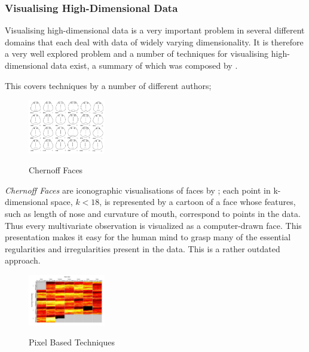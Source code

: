 \documentclass[a4paper,11pt,titlepage]{article}
\begin{document}
	\subsubsection{Visualising High-Dimensional Data}
	Visualising high-dimensional data is a very important problem in several different domains that each deal with data of widely varying dimensionality. It is therefore a very well explored problem and a number of techniques for visualising high-dimensional data exist, a summary of which was composed by \cite{Cristina2003}.
	\par 
	This covers techniques by a number of different authors;	
		\par
		
 	\begin{figure}[H]
    			\centering	
			{{\includegraphics[width=0.3\textwidth]
    				{img/chernoff_faces} 
    			}}%
    			\caption{Chernoff Faces}%
    		\label{fig:lascaux}
	\end{figure}
 		
		 \textit{Chernoff Faces} are iconographic visualisations of faces by \cite{Chernoff1973}; each point in k-dimensional space, $ k < 18 $, is represented by a cartoon of a face whose features, such as length of nose and curvature of mouth, correspond to points in the data. Thus every multivariate observation is visualized as a computer-drawn face. This presentation makes it easy for the human mind to grasp many of the essential regularities and irregularities present in the data. This is a rather outdated approach.
		 \par
 		
 	\begin{figure}[H]
    			\centering	
			{{\includegraphics[width=0.3\textwidth]
    				{img/kiem_pixel_two} 
    			}}%
    			\caption{Pixel Based Techniques}%
    		\label{fig:lascaux}
	\end{figure}	
 		
\end{document}

